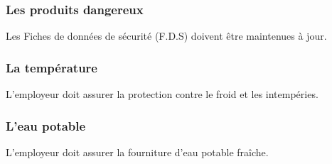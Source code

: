 \documentclass{beamer}
\begin{document}
\begin{frame}
\frametitle{Les produits dangereux}

Les  Fiches de données de sécurité (F.D.S) doivent être maintenues à jour.

\end{frame}

\begin{frame}
\frametitle{La température}

L’employeur doit assurer la protection contre le froid et les intempéries.

\end{frame}

\begin{frame}
\frametitle{L’eau potable}

L’employeur doit assurer la fourniture d’eau potable fraîche.


\end{frame}
\end{document}
